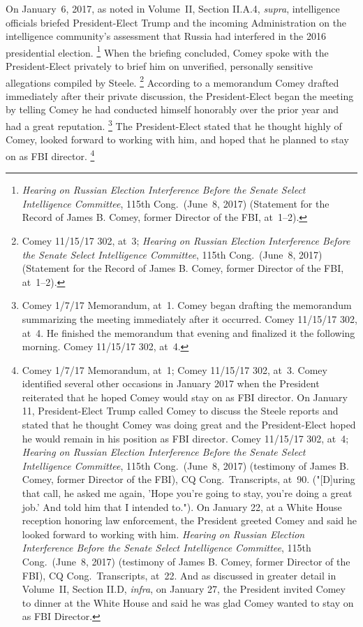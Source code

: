 On January~6, 2017, as noted in Volume~II, Section II.A.4, \textit{supra}, intelligence officials briefed President-Elect Trump and the incoming Administration on the intelligence community's assessment that Russia had interfered in the 2016 presidential election.%
\footnote{\textit{Hearing on Russian Election Interference Before the Senate Select Intelligence Committee}, 115th Cong.\ (June~8, 2017) (Statement for the Record of James B. Comey, former Director of the FBI, at~1--2).}
When the briefing concluded, Comey spoke with the President-Elect privately to brief him on unverified, personally sensitive allegations compiled by Steele.%
\footnote{Comey 11/15/17 302, at~3;
\textit{Hearing on Russian Election Interference Before the Senate Select Intelligence Committee}, 115th Cong.\ (June~8, 2017) (Statement for the Record of James B. Comey, former Director of the FBI, at~1--2).}
According to a memorandum Comey drafted immediately after their private discussion, the President-Elect began the meeting by telling Comey he had conducted himself honorably over the prior year and had a great reputation.%
\footnote{Comey 1/7/17 Memorandum, at~1.
Comey began drafting the memorandum summarizing the meeting immediately after it occurred.
Comey 11/15/17 302, at~4.
He finished the memorandum that evening and finalized it the following morning.
Comey 11/15/17 302, at~4.}
The President-Elect stated that he thought highly of Comey, looked forward to working with him, and hoped that he planned to stay on as FBI director.%
\footnote{Comey 1/7/17 Memorandum, at~1;
Comey 11/15/17 302, at~3.
Comey identified several other occasions in January 2017 when the President reiterated that he hoped Comey would stay on as FBI director.
On January 11, President-Elect Trump called Comey to discuss the Steele reports and stated that he thought Comey was doing great and the President-Elect hoped he would remain in his position as FBI director.
Comey 11/15/17 302, at~4;
\textit{Hearing on Russian Election Interference Before the Senate Select Intelligence Committee}, 115th Cong.\ (June~8, 2017) (testimony of James B. Comey, former Director of the FBI), CQ Cong.\ Transcripts, at~90.
("[D]uring that call, he asked me again, 'Hope you're going to stay, you're doing a great job.' And told him that I intended to.").
On January 22, at a White House reception honoring law enforcement, the President greeted Comey and said he looked forward to working with him.
\textit{Hearing on Russian Election Interference Before the Senate Select Intelligence Committee}, 115th Cong.\ (June~8, 2017) (testimony of James B. Comey, former Director of the FBI), CQ Cong.\ Transcripts, at~22.
And as discussed in greater detail in Volume~II, Section II.D, \textit{infra}, on January 27, the President invited Comey to dinner at the White House and said he was glad Comey wanted to stay on as FBI Director.}
